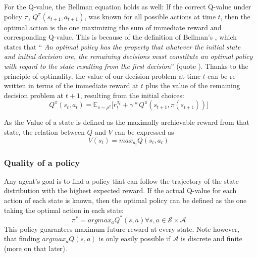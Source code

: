 For the Q-value, the Bellman equation holds as well: If the correct Q-value under policy $\pi$, $Q^\pi(s_{t+1},a_{t+1})$, was known for all possible actions at time $t$, then the optimal action is the one maximizing the sum of immediate reward and corresponding Q-value. This is because of the definition of Bellman's , which states that ``\kern-2pt \textit{An optimal policy has the property that whatever the initial state and initial decision are, the remaining decisions must constitute an optimal policy with regard to the state resulting from the first decision}''  (quote \cite{bellman_dynamic_nodate}). Thanks to the principle of optimality, the value of our decision problem at time $t$ can be re-written in terms of the immediate reward at $t$ plus the value of the remaining decision problem at $t+1$, resulting from the initial choices:
\begin{equation} \label{bellman}
	Q^\pi(s_t,a_t) =  \mathds{E}_{s\sim\rho^\pi} \big[r_t^{a_t} + \gamma *  Q^\pi(s_{t+1},\pi(s_{t+1}))  \big]
\end{equation}

As the Value of a state is defined as the maximally archievable reward from that state, the relation between $Q$ and $V$ can be expressed as
\begin{equation} \label{eq:QandV}
V(s_t) = max_{a_t} Q(s_t, a_t)
\end{equation}

\subsubsection{Quality of a policy}

Any agent's goal is to find a policy that can follow the trajectory of the state distribution with the highest expected reward. If the actual Q-value for each action of each state is known, then the optimal policy can be defined as the one taking the optimal action in each state:
\begin{equation}
	\pi^* = argmax_aQ^*(s,a) \forall s,a \in \mathcal{S} \times \mathcal{A}
\end{equation}
This policy guarantees maximum future reward at every state. Note however, that finding $argmax_aQ(s,a)$ is only easily possible if $\mathcal{A}$ is discrete and finite (more on that later). 

